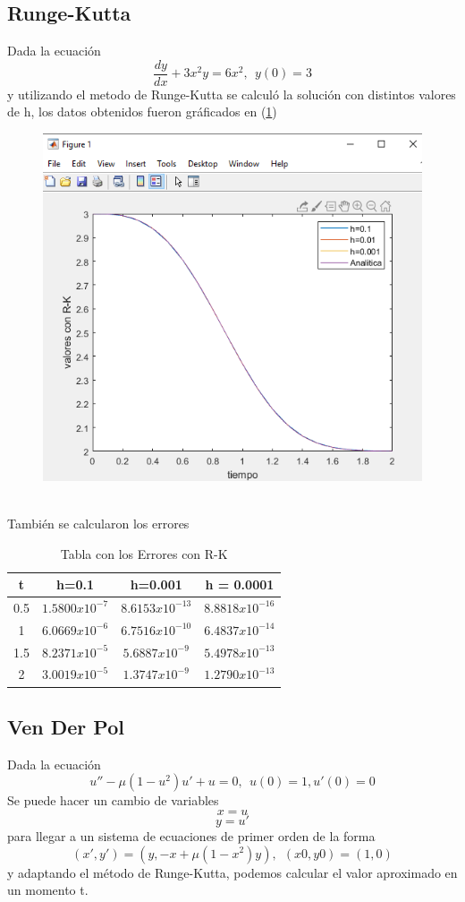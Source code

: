 \documentclass[12pt]{article}
\begin{document}
\subsection{Runge-Kutta}
Dada la ecuación $$\frac{dy}{dx}+3x^2y=6x^2,~~y(0)=3$$ y utilizando el metodo de Runge-Kutta se calculó la solución con distintos valores de h, los datos obtenidos fueron gráficados en (\ref{graf4})
\begin{figure}[h]
	\centering
	\caption{}
	\includegraphics[scale=0.45]{graf4.png}
	\label{graf4}
\end{figure}\\
También se calcularon los errores
\begin{table}[h]
	\centering
	\begin{tabular}{|c|c|c|c|}
		\hline
		t & h=0.1 & h=0.001 & h = 0.0001 \\
		\hline
		0.5&$1.5800x10^{-7}$&$8.6153x10^{-13}$&$8.8818x10^{-16}$\\
		\hline
		1&$6.0669x10^{-6}$&$6.7516x10^{-10}$&$6.4837x10^{-14}$\\
		\hline
		1.5&$8.2371x10^{-5}$&$5.6887x10^{-9}$&$5.4978x10^{-13}$\\
		\hline
		2&$3.0019x10^{-5}$&$1.3747x10^{-9}$&$1.2790x10^{-13}$\\
		\hline
	\end{tabular}
	\caption{Tabla con los Errores con R-K}
	\label{table4}
\end{table}
\subsection{Ven Der Pol}
Dada la ecuación
\begin{equation}
	u''-\mu(1-u^2)u'+u=0,~~u(0)=1, u'(0)=0
	\label{Pol}
\end{equation}
Se puede hacer un cambio de variables $$x = u$$$$y = u'$$
para llegar a un sistema de ecuaciones de primer orden de la forma $$(x',y') = (y, -x+\mu(1-x^2)y),~~(x0,y0)=(1,0)$$ y adaptando el método de Runge-Kutta, podemos calcular el valor aproximado en un momento t.
\end{document}
